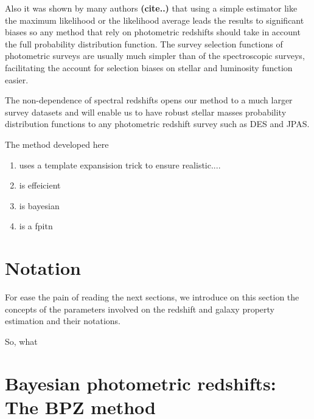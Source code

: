 \documentclass[9pt]{memoir}
\begin{document}
Also it was shown by many authors \textbf{(cite..)} that using a simple estimator like the maximum likelihood or the likelihood average leads the results to significant biases so any method that rely on photometric redshifts should take in account the full probability distribution function. The survey selection functions of photometric surveys are usually much simpler than of the spectroscopic surveys, facilitating the account for selection biases on stellar and luminosity function easier.

The non-dependence of spectral redshifts opens our method to a much larger survey datasets and will enable us to have robust stellar masses probability distribution functions to any photometric redshift survey such as DES and JPAS.


The method developed here 

\begin{enumerate}

\item uses a template expansision trick to ensure realistic....

\item is effeicient

\item is bayesian

\item is a fpitn

\end{enumerate}

\section{Notation}
\label{sec:notation}

For ease the pain of reading the next sections, we introduce on this section the concepts of the parameters involved on the redshift and galaxy property estimation and their notations.

So, what 





\section{Bayesian photometric redshifts: The BPZ method}
\label{sec:bpz}
\end{document}
